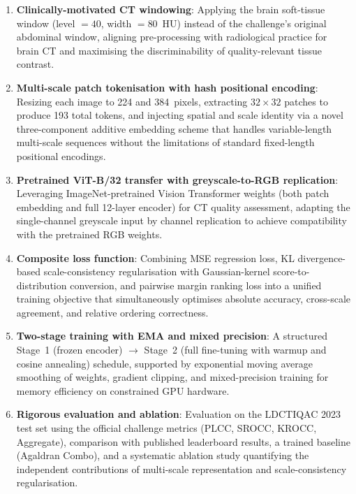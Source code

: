 \begin{enumerate}
    \item \textbf{Clinically-motivated CT windowing}: Applying the brain soft-tissue
          window (level $= 40$, width $= 80$~HU) instead of the challenge's original
          abdominal window, aligning pre-processing with radiological practice for brain
          CT and maximising the discriminability of quality-relevant tissue contrast.
    \item \textbf{Multi-scale patch tokenisation with hash positional encoding}:
          Resizing each image to 224 and 384~pixels, extracting $32 \times 32$ patches
          to produce 193 total tokens, and injecting spatial and scale identity via a
          novel three-component additive embedding scheme that handles variable-length
          multi-scale sequences without the limitations of standard fixed-length
          positional encodings.
    \item \textbf{Pretrained ViT-B/32 transfer with greyscale-to-RGB replication}:
          Leveraging ImageNet-pretrained Vision Transformer weights (both patch embedding
          and full 12-layer encoder) for CT quality assessment, adapting the
          single-channel greyscale input by channel replication to achieve compatibility
          with the pretrained RGB weights.
    \item \textbf{Composite loss function}: Combining MSE regression loss,
          KL divergence-based scale-consistency regularisation with Gaussian-kernel
          score-to-distribution conversion, and pairwise margin ranking loss into a
          unified training objective that simultaneously optimises absolute accuracy,
          cross-scale agreement, and relative ordering correctness.
    \item \textbf{Two-stage training with EMA and mixed precision}: A structured
          Stage~1 (frozen encoder) $\to$ Stage~2 (full fine-tuning with warmup and
          cosine annealing) schedule, supported by exponential moving average smoothing
          of weights, gradient clipping, and mixed-precision training for memory
          efficiency on constrained GPU hardware.
    \item \textbf{Rigorous evaluation and ablation}: Evaluation on the LDCTIQAC 2023
          test set using the official challenge metrics (PLCC, SROCC, KROCC, Aggregate),
          comparison with published leaderboard results, a trained baseline (Agaldran
          Combo), and a systematic ablation study quantifying the independent
          contributions of multi-scale representation and scale-consistency
          regularisation.
\end{enumerate}
